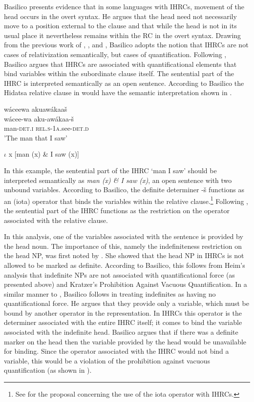 \documentclass[output=paper]{LSP/langsci}
\begin{document}
Basilico presents evidence that in some languages with IHRCs, movement of the head occurs in the overt syntax. He argues that the head need not necessarily move to a position external to the clause and that while the head is not in its usual place it nevertheless remains within the RC in the overt syntax. Drawing from the previous work of \citet{Williamson1987}, \citet{Jelinek1987}, and \citet{Culy1990}, Basilico adopts the notion that IHRCs are not cases of relativization semantically, but cases of quantification. Following \citet{Heim1982}, Basilico argues that IHRCs are associated with quantificational elements that bind variables within the subordinate clause itself. The sentential part of the IHRC is interpreted semantically as an open sentence. According to Basilico the Hidatsa relative clause in  would have the semantic interpretation shown in .

\ea \label{boyle42}
\glll w\'aceewa     akuaw\'akaa\v{s}\\
w\'acee-wa       aku-aw\'akaa-\v{s}\\
man-\textsc{det.i}  \textsc{rel.s-1a}.see-\textsc{det.d}\\
\trans 'The man that I saw'
\z

\ea \label{boyle43}
 $\iota$ x [man (x) \& I saw (x)]  
\z

In this example, the sentential part of the IHRC `man I saw' should be interpreted semantically as \textit{man (x) \& I saw (x)}, an open sentence with two unbound variables.  According to Basilico, the definite determiner -\v{s} functions as an (iota) operator that binds the variables within the relative clause.\footnote{See \citet{Jelinek1987} for the proposal concerning the use of the iota operator with IHRCs.} Following \citet{Culy1990}, the sentential part of the IHRC functions as the restriction on the operator associated with the relative clause.  

In this analysis, one of the variables associated with the sentence is provided by the head noun. The importance of this, namely the indefiniteness restriction on the head NP, was first noted by \citet{Williamson1987}. She showed that the head NP in IHRCs is not allowed to be marked as definite. According to Basilico, this follows from Heim's  analysis that indefinite NPs are not associated with quantificational force (as presented above) and Kratzer's  Prohibition Against Vacuous Quantification. In a similar manner to \citet{Culy1990}, Basilico follows \citet{Heim1982} in treating indefinites as having no quantificational force. He argues that they provide only a variable, which must be bound by another operator in the representation. In IHRCs this operator is the determiner associated with the entire IHRC itself; it comes to bind the variable associated with the indefinite head. Basilico argues that if there was a definite marker on the head then the variable provided by the head would be unavailable for binding. Since the operator associated with the IHRC would not bind a variable, this would be a violation of the prohibition against vacuous quantification (as shown in ).
\end{document}
